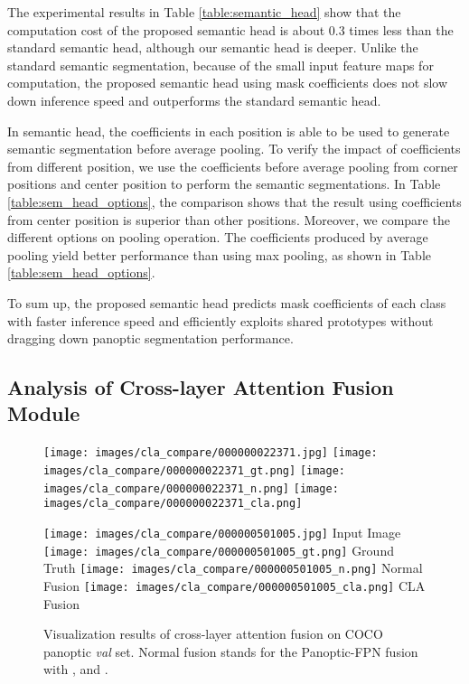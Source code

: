 \documentclass[runningheads]{llncs}
\begin{document}
The experimental results in Table  \ref{table:semantic_head} show that the computation cost of the proposed semantic head is about 0.3 times less than the standard semantic head, although our semantic head is deeper. Unlike the standard semantic segmentation, because of the small input feature maps for computation, the proposed semantic head using mask coefficients does not slow down inference speed and outperforms the standard semantic head.

In semantic head, the coefficients  in each position is able to be used to generate semantic segmentation before average pooling. To verify the impact of coefficients from different position, we use the coefficients before average pooling from corner positions and center position to perform the semantic segmentations. In Table \ref{table:sem_head_options}, the comparison shows that the result using coefficients from center position is superior than other positions. Moreover, we compare the different options on pooling operation. The coefficients produced by average pooling yield better performance than using max pooling, as shown in Table \ref{table:sem_head_options}.

To sum up, the proposed semantic head predicts mask coefficients of each class with faster inference speed and efficiently exploits shared prototypes without dragging down panoptic segmentation performance. 

\subsection{Analysis of Cross-layer Attention Fusion Module }

\begin{figure}[!t]
  \texttt{[image: images/cla\_compare/000000022371.jpg]}
\endminipage\hfill
{}
  \texttt{[image: images/cla\_compare/000000022371\_gt.png]}
\endminipage\hfill
{}\texttt{[image: images/cla\_compare/000000022371\_n.png]}
\endminipage \hfill
{}\texttt{[image: images/cla\_compare/000000022371\_cla.png]}
\endminipage



    \centering
  \texttt{[image: images/cla\_compare/000000501005.jpg]} 
  Input Image
\endminipage\hfill
{}
    \centering
  \texttt{[image: images/cla\_compare/000000501005\_gt.png]}
  Ground Truth
\endminipage\hfill
{}\centering
  \texttt{[image: images/cla\_compare/000000501005\_n.png]}
  Normal Fusion
\endminipage \hfill
{}\centering
  \texttt{[image: images/cla\_compare/000000501005\_cla.png]}
  CLA Fusion
\endminipage
\caption{Visualization results of cross-layer attention fusion on COCO panoptic \emph{val} set. Normal fusion stands for the Panoptic-FPN  \cite{DeGeus2018a} fusion with , and . }
\label{fig:cla_fusion_compare}
\end{figure}
\end{document}
